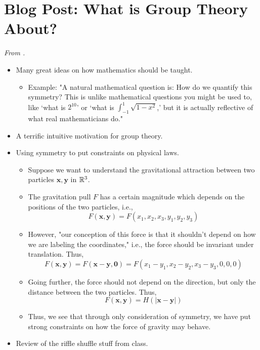 \documentclass[../notes.tex]{subfiles}
\begin{document}
\section{Blog Post: What is Group Theory About?}
\emph{From \textcite{bib:Calegari}.}
\begin{itemize}
    \item {}Many great ideas on how mathematics should be taught.
    \begin{itemize}
        \item Example: "A natural mathematical question is: How do we quantify this symmetry? This is unlike mathematical questions you might be used to, like `what is $2^{10}$' or `what is $\int_{-1}^1\sqrt{1-x^2}$,' but it is actually reflective of what real mathematicians do."
    \end{itemize}
    \item A terrific intuitive motivation for group theory.
    \item Using symmetry to put constraints on physical laws.
    \begin{itemize}
        \item Suppose we want to understand the gravitational attraction between two particles $\mathbf{x},\mathbf{y}$ in $\mathbb{R}^3$.
        \item The gravitation pull $F$ has a certain magnitude which depends on the positions of the two particles, i.e.,
        \begin{equation*}
            F(\mathbf{x},\mathbf{y}) = F(x_1,x_2,x_3,y_1,y_2,y_3)
        \end{equation*}
        \item However, "our conception of this force is that it shouldn't depend on how we are labeling the coordinates," i.e., the force should be invariant under translation. Thus,
        \begin{equation*}
            F(\mathbf{x},\mathbf{y}) = F(\mathbf{x}-\mathbf{y},\bm{0})
            = F(x_1-y_1,x_2-y_2,x_3-y_3,0,0,0)
        \end{equation*}
        \item Going further, the force should not depend on the direction, but only the distance between the two particles. Thus,
        \begin{equation*}
            F(\mathbf{x},\mathbf{y}) = H(|\mathbf{x}-\mathbf{y}|)
        \end{equation*}
        \item Thus, we see that through only consideration of symmetry, we have put strong constraints on how the force of gravity may behave.
    \end{itemize}
    \item Review of the riffle shuffle stuff from class.
\end{itemize}
\end{document}
